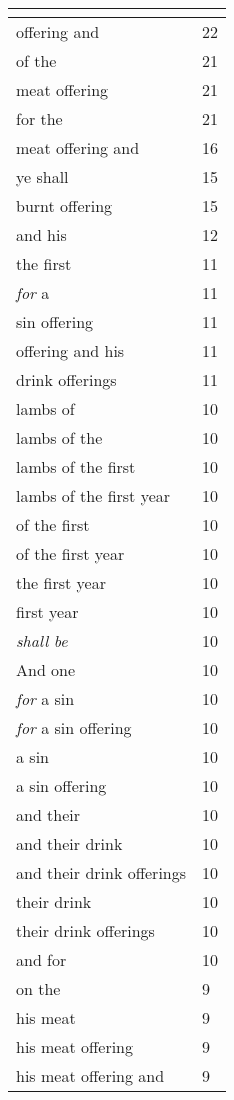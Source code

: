\begin{center}
\begin{longtable}{|p{3.0in}|p{0.5in}|}
\hline \multicolumn{2}{c}{{ }} \\ \hline
\endfoot 
offering and & 22\\ \hline 
of the & 21\\ \hline 
meat offering & 21\\ \hline 
for the & 21\\ \hline 
meat offering and & 16\\ \hline 
ye shall & 15\\ \hline 
burnt offering & 15\\ \hline 
and his & 12\\ \hline 
the first & 11\\ \hline 
\emph{for} a & 11\\ \hline 
sin offering & 11\\ \hline 
offering and his & 11\\ \hline 
drink offerings & 11\\ \hline 
lambs of & 10\\ \hline 
lambs of the & 10\\ \hline 
lambs of the first & 10\\ \hline 
lambs of the first year & 10\\ \hline 
of the first & 10\\ \hline 
of the first year & 10\\ \hline 
the first year & 10\\ \hline 
first year & 10\\ \hline 
\emph{shall} \emph{be} & 10\\ \hline 
And one & 10\\ \hline 
\emph{for} a sin & 10\\ \hline 
\emph{for} a sin offering & 10\\ \hline 
a sin & 10\\ \hline 
a sin offering & 10\\ \hline 
and their & 10\\ \hline 
and their drink & 10\\ \hline 
and their drink offerings & 10\\ \hline 
their drink & 10\\ \hline 
their drink offerings & 10\\ \hline 
and for & 10\\ \hline 
on the & 9\\ \hline 
his meat & 9\\ \hline 
his meat offering & 9\\ \hline 
his meat offering and & 9\\ \hline 

\end{longtable}
\end{center}
